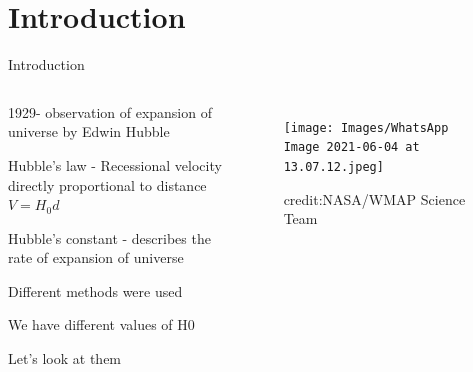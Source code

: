 \documentclass[aspectratio=169]{beamer}                    %
\begin{document}
\section{Introduction}
\begin{frame}{Introduction}
    \begin{columns}
    \begin{vfilleditems}
        \item 1929- observation of expansion of universe by Edwin Hubble
        \item Hubble’s law - Recessional velocity directly proportional to distance $V = H_0d$
        \item Hubble’s constant - describes the rate of expansion of universe
        \item Different methods were used 
        \item We have different values of H0
        \item Let's look at them
    \end{vfilleditems}
    \begin{figure}
        \centering
        \texttt{[image: Images/WhatsApp Image 2021-06-04 at 13.07.12.jpeg]}
        \caption{credit:NASA/WMAP Science Team}
        \label{fig:expansion}
    \end{figure}
    \end{columns}
\end{frame}
\end{document}
